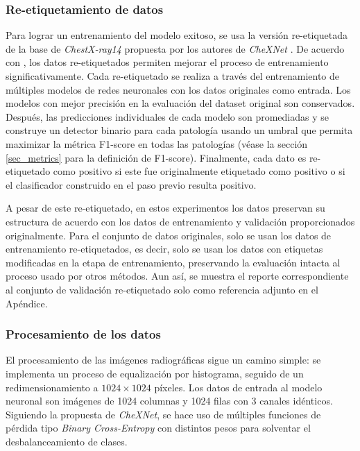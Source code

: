 \subsubsection{Re-etiquetamiento de datos}
\label{ssec_relabelling}

Para lograr un entrenamiento del modelo exitoso, se usa la versión re-etiquetada de la base de
\textit{ChestX-ray14} propuesta por los autores de \textit{CheXNet} \cite{rajpurkar2018deep}. De
acuerdo con \cite{rajpurkar2018deep}, los datos re-etiquetados permiten mejorar el proceso de
entrenamiento significativamente. Cada re-etiquetado se realiza a través del entrenamiento de
múltiples modelos de redes neuronales con los datos originales como entrada. Los modelos con mejor
precisión en la evaluación del dataset original son conservados. Después, las predicciones
individuales de cada modelo son promediadas y se construye un detector binario para cada patología
usando un umbral que permita maximizar la métrica F1-score en todas las patologías (véase la sección
\ref{sec_metrics} para la definición de F1-score). Finalmente, cada dato es re-etiquetado como
positivo si este fue originalmente etiquetado como positivo o si el clasificador construido en el
paso previo resulta positivo.

A pesar de este re-etiquetado, en estos experimentos los datos preservan su estructura de acuerdo
con los datos de entrenamiento y validación proporcionados originalmente. Para el conjunto de datos
originales, solo se usan los datos de entrenamiento re-etiquetados, es decir, solo se usan los datos
con etiquetas modificadas en la etapa de entrenamiento, preservando la evaluación intacta al proceso
usado por otros métodos. Aun así, se muestra el reporte correspondiente al conjunto de validación
re-etiquetado solo como referencia adjunto en el Apéndice.


\subsubsection{Procesamiento de los datos}

El procesamiento de las imágenes radiográficas sigue un camino simple: se implementa un proceso de
equalización por histograma, seguido de un redimensionamiento a $1024 \times 1024$ píxeles. Los datos
de entrada al modelo neuronal son imágenes de 1024 columnas y 1024 filas con 3 canales idénticos.
Siguiendo la propuesta de \textit{CheXNet}, se hace uso de múltiples funciones de pérdida tipo
\textit{Binary Cross-Entropy} con distintos pesos para solventar el desbalanceamiento de clases.


